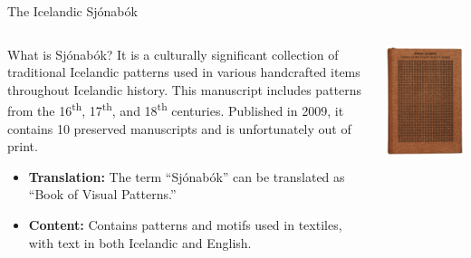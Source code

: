 \documentclass[
    NAME={Dr. Helga Ingimundardóttir},
    EMAIL={helgaingim@hi.is},
    FACULTY={Industrial Engineering},
    TITLE={HiDef Textiles: Reviving Tradition with Innovation},
    SUBTITLE={Empowering Creativity and Sustainability in Textile Production through Digital Transformation},
    SEMINAR={Reykjavík DataBeers},
    DATE={January 25, 2025},
    WIDE={true}
]{HI-LaTeX/hi-beamer}
\begin{document}
\begin{frame}[allowframebreaks]{The Icelandic Sjónabók}

\begin{columns}
    \begin{column}{0.7\textwidth}
        \begin{block}{What is Sjónabók?}
        It is a culturally significant collection of traditional Icelandic patterns used in various handcrafted items throughout Icelandic history. This manuscript includes patterns from the 16\textsuperscript{th}, 17\textsuperscript{th}, and 18\textsuperscript{th} centuries. Published in 2009, it contains 10 preserved manuscripts and is unfortunately out of print.
        \end{block}

        \begin{itemize}
            \item \textbf{Translation:} The term ``Sjónabók'' can be translated as ``Book of Visual Patterns.''
            \item \textbf{Content:} Contains patterns and motifs used in textiles, with text in both Icelandic and English.
        \end{itemize}
    \end{column}
    
    \begin{column}{0.3\textwidth}
        \includegraphics[width=\textwidth]{include/sjónabók.png}
    \end{column}
\end{columns}


\end{frame}
\end{document}
